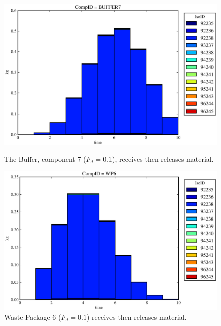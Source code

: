 \begin{figure}[ht]
\begin{minipage}[b]{0.45\linewidth}
  \includegraphics[width=\textwidth]{./chapters/demonstration/base/mcI3.eps}
  \caption[Case MCI Buffer Contaminants]{
    The Buffer, component 7 ($F_d=0.1$), receives then releases material.
    }
  \label{fig:mcIbuff}

\end{minipage}
\hspace{0.05\linewidth}
\begin{minipage}[b]{0.45\linewidth}
  \includegraphics[width=\textwidth]{./chapters/demonstration/base/mcI2.eps}
  \caption[Case MCI Waste Package Contaminants.]{ 
    Waste Package 6 ($F_d = 0.1$) receives then releases material.
    }
  \label{fig:mcIwp6}


\end{minipage}
\end{figure}
